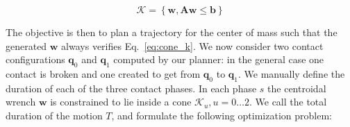 \begin{equation}
\label{eq:cone_k}
	\mathcal{K} =  \left\{ \mathbf{w}, \mathbf{A}\mathbf{w} \leq \mathbf{b	} \right\}
\end{equation}

The objective 
is then to plan a trajectory for the center of mass such that the generated $\mathbf{w}$ always verifies Eq.~\ref{eq:cone_k}. 
We now consider two contact configurations  $\mathbf{q}_0$ and $\mathbf{q}_1$ computed by our planner: in the general case one contact is broken and one created to get from
$\mathbf{q}_0$ to $\mathbf{q}_1$. We manually define the duration of each of the three contact phases.
In each phase $s$ the centroidal wrench $\mathbf{w}$ is constrained to lie inside a cone $\mathcal{K}_u, u =0 \dots 2$.
We call the total duration of the motion $T$, and formulate the following optimization problem:

